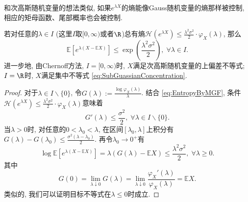和次高斯随机变量的想法类似, 如果$e^{\lambda X}$的熵能像Gauss随机变量的熵那样被控制, 相应的矩母函数、尾部概率也会被控制.
\begin{theorem}[Herbst方法]\label{thm:HerbstArgument}
	若对任意的$\lambda \in I$ (这里$I$取$[0, \infty)$或者$\R$)总有熵$\mathcal{H}(e^{\lambda X}) \leq \frac{\lambda^2 \sigma^2}{2} \cdot \varphi_X(\lambda)$, 那么
	\begin{equation*}
		\mathbb{E}\left[e^{\lambda(X - \mathbb{E}X)}\right] 
		\leq \exp \left( \frac{\lambda^2 \sigma^2}{2} \right),\; 
		\forall \lambda \in I. 
	\end{equation*}
	进一步地, 由Chernoff方法, $I = [0, \infty)$时, $X$满足次高斯随机变量的上偏差不等式; $I = \R$时, $X$满足集中不等式 \eqref{eq:SubGuassianConcentration}.
\end{theorem}
\begin{proof}
	对于$\lambda \in I \backslash \{0\}$, 令$G(\lambda) := \frac{\log \varphi_X(\lambda)}{\lambda}$. 
	结合 \eqref{eq:EntropyByMGF}, 条件$\mathcal{H}(e^{\lambda X}) \leq \frac{\lambda^2 \sigma^2}{2} \cdot \varphi_X(\lambda)$意味着
	\begin{equation*}
		G'(\lambda) \leq \frac{\sigma^2}{2},\; \forall \lambda \in I \backslash \{0\}. 
	\end{equation*}
	当$\lambda > 0$时, 对任意的$0 < \lambda_0 < \lambda$, 在区间$[\lambda_0, \lambda]$上积分有$G(\lambda) - G(\lambda_0) \leq \frac{\sigma^2 (\lambda - \lambda_0)}{2}$. 
	再令$\lambda_0 \to 0^+$有
	\begin{equation*}
		\log \mathbb{E}\left[e^{\lambda(X - \mathbb{E}X)}\right]
		= \lambda(G(\lambda) - \mathbb{E}X)
		\leq \frac{\lambda^2 \sigma^2}{2} ,\; 
		\forall \lambda \geq 0. 
	\end{equation*}
	其中
	\begin{equation*}
		G(0) 
		= \lim_{\lambda \downarrow 0} G(\lambda) 
		= \lim_{\lambda \downarrow 0} \frac{\varphi_X'(\lambda)}{\varphi_X(\lambda)}
		= \mathbb{E}X. 
	\end{equation*}
	类似的, 我们可以证明目标不等式在$\lambda \leq 0$时成立. 
\end{proof}

